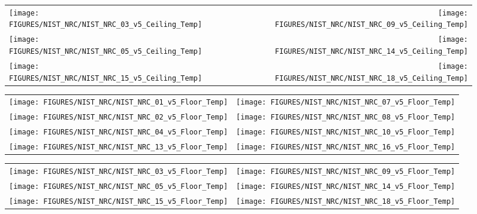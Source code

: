\begin{figure}[h!]
\begin{tabular*}{\textwidth}{l@{\extracolsep{\fill}}r}
\texttt{[image: FIGURES/NIST\_NRC/NIST\_NRC\_03\_v5\_Ceiling\_Temp]} &
\texttt{[image: FIGURES/NIST\_NRC/NIST\_NRC\_09\_v5\_Ceiling\_Temp]} \\
\texttt{[image: FIGURES/NIST\_NRC/NIST\_NRC\_05\_v5\_Ceiling\_Temp]} &
\texttt{[image: FIGURES/NIST\_NRC/NIST\_NRC\_14\_v5\_Ceiling\_Temp]} \\
\texttt{[image: FIGURES/NIST\_NRC/NIST\_NRC\_15\_v5\_Ceiling\_Temp]} &
\texttt{[image: FIGURES/NIST\_NRC/NIST\_NRC\_18\_v5\_Ceiling\_Temp]}
\end{tabular*}
\label{NIST_NRC_Ceiling_Temp_Open}
\end{figure}

\clearpage


\begin{figure}[h!]
\begin{tabular*}{\textwidth}{l@{\extracolsep{\fill}}r}
\texttt{[image: FIGURES/NIST\_NRC/NIST\_NRC\_01\_v5\_Floor\_Temp]} &
\texttt{[image: FIGURES/NIST\_NRC/NIST\_NRC\_07\_v5\_Floor\_Temp]} \\
\texttt{[image: FIGURES/NIST\_NRC/NIST\_NRC\_02\_v5\_Floor\_Temp]} &
\texttt{[image: FIGURES/NIST\_NRC/NIST\_NRC\_08\_v5\_Floor\_Temp]} \\
\texttt{[image: FIGURES/NIST\_NRC/NIST\_NRC\_04\_v5\_Floor\_Temp]} &
\texttt{[image: FIGURES/NIST\_NRC/NIST\_NRC\_10\_v5\_Floor\_Temp]} \\
\texttt{[image: FIGURES/NIST\_NRC/NIST\_NRC\_13\_v5\_Floor\_Temp]} &
\texttt{[image: FIGURES/NIST\_NRC/NIST\_NRC\_16\_v5\_Floor\_Temp]}
\end{tabular*}
\label{NIST_NRC_Floor_Temp_Closed}
\end{figure}

\begin{figure}[h!]
\begin{tabular*}{\textwidth}{l@{\extracolsep{\fill}}r}
\texttt{[image: FIGURES/NIST\_NRC/NIST\_NRC\_03\_v5\_Floor\_Temp]} &
\texttt{[image: FIGURES/NIST\_NRC/NIST\_NRC\_09\_v5\_Floor\_Temp]} \\
\texttt{[image: FIGURES/NIST\_NRC/NIST\_NRC\_05\_v5\_Floor\_Temp]} &
\texttt{[image: FIGURES/NIST\_NRC/NIST\_NRC\_14\_v5\_Floor\_Temp]} \\
\texttt{[image: FIGURES/NIST\_NRC/NIST\_NRC\_15\_v5\_Floor\_Temp]} &
\texttt{[image: FIGURES/NIST\_NRC/NIST\_NRC\_18\_v5\_Floor\_Temp]}
\end{tabular*}
\label{NIST_NRC_Floor_Temp_Open}
\end{figure}

